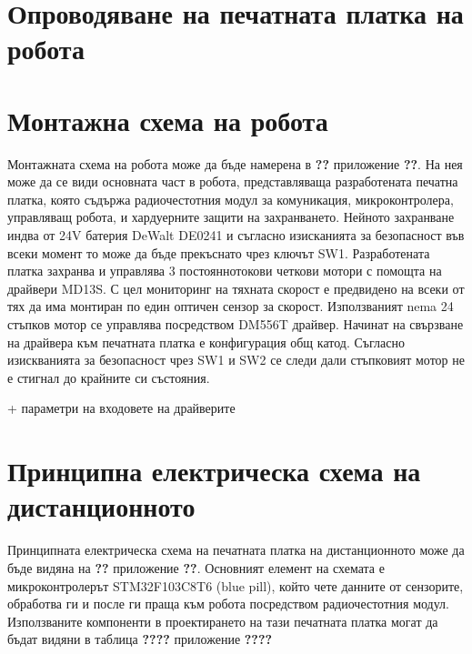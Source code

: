 
\section{Опроводяване на печатната платка на робота}


\section{Монтажна схема на робота}

Монтажната схема на робота може да бъде намерена в \textbf{??} приложение \textbf{??}. На нея може да се види основната част в робота, представляваща разработената печатна платка, която съдържа радиочестотния модул за комуникация, микроконтролера, управляващ робота, и хардуерните защити на захранването. Нейното захранване индва от 24V батерия DeWalt DE0241 и съгласно изисканията за безопасност във всеки момент то може да бъде прекъснато чрез ключът SW1. Разработената платка захранва и управлява 3 постояннотокови четкови мотори с помощта на драйвери MD13S. С цел мониторинг на тяхната скорост е предвидено на всеки от тях да има монтиран по един оптичен сензор за скорост. Използваният nema 24 стъпков мотор се управлява посредством DM556T драйвер. Начинат на свързване на драйвера към печатната платка е конфигурация общ катод. Съгласно изискванията за безопасност чрез SW1 и SW2 се следи дали стъпковият мотор не е стигнал до крайните си състояния.

+ параметри на входовете на драйверите


\section{Принципна електрическа схема на дистанционното}

Принципната електрическа схема на печатната платка на дистанционното може да бъде видяна на \textbf{??} приложение \textbf{??}. Основният елемент на схемата е микроконтролерът STM32F103C8T6 (blue pill), който чете данните от сензорите, обработва ги и после ги праща към робота посредством радиочестотния модул. Използваните компоненти в проектирането на тази печатната платка могат да бъдат видяни в таблица \textbf{????} приложение \textbf{????}



